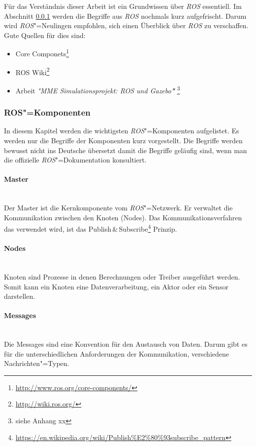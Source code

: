 Für das Verständnis dieser Arbeit ist ein Grundwissen über \textit{ROS} essentiell.
Im Abschnitt \ref{chap:ros-komponenten} werden die Begriffe aus \textit{ROS} nochmals kurz aufgefrischt.
Darum wird \textit{ROS}"=Neulingen empfohlen, sich einen Überblick über \textit{ROS} zu verschaffen.
Gute Quellen für dies sind:
\begin{itemize}
\item Core Componets\footnote{\url{http://www.ros.org/core-components/}} 
\item ROS Wiki\footnote{\url{http://wiki.ros.org/}}
\item Arbeit \textit{\textsc{"}MME Simulationsprojekt: ROS und Gazebo\textbf{"}} \footnote{siehe Anhang xx} %
\end{itemize}

\subsubsection{ROS"=Komponenten}
\label{chap:ros-komponenten}
In diesem Kapitel werden die wichtigsten \textit{ROS}"=Komponenten aufgelistet.
Es werden nur die Begriffe der Komponenten kurz vorgestellt.
Die Begriffe werden bewusst nicht ins Deutsche übersetzt damit die Begriffe geläufig sind, wenn man die offizielle \textit{ROS}"=Dokumentation konsultiert.

\paragraph*{Master} \mbox{}\\
Der Master ist die Kernkomponente vom \textit{ROS}"=Netzwerk.
Er verwaltet die Kommunikation zwischen den Knoten (Nodes).
Das Kommunikationsverfahren das verwendet wird, ist das Publish\,\&\,Subscribe\footnote{\url{https://en.wikipedia.org/wiki/Publish\%E2\%80\%93subscribe_pattern}}  Prinzip. 

\paragraph*{Nodes} \mbox{}\\
Knoten sind Prozesse in denen Berechnungen oder Treiber ausgeführt werden. 
Somit kann ein Knoten eine Datenverarbeitung, ein Aktor oder ein Sensor darstellen.  

\paragraph*{Messages} \mbox{}\\
Die Messages sind eine Konvention für den Austausch von Daten.
Darum gibt es für die unterschiedlichen Anforderungen der Kommunikation, verschiedene Nachrichten"=Typen.

